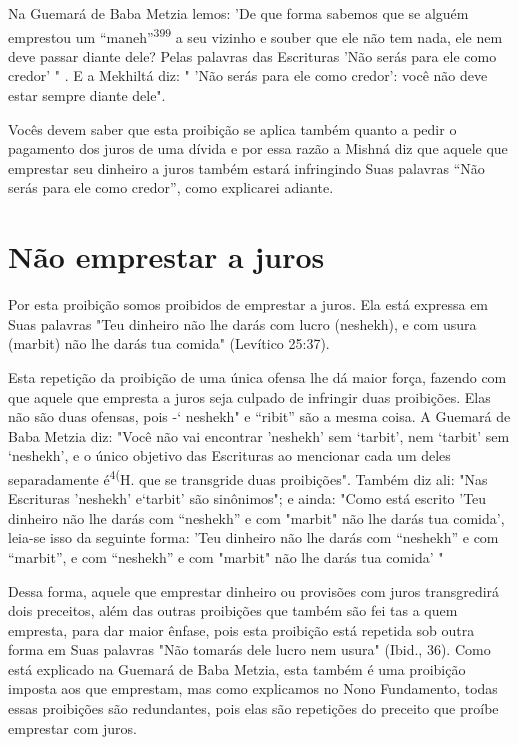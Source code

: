 Na Guemará de Baba Metzia lemos: 'De que forma sabemos que se alguém
emprestou um ``maneh''\textsuperscript{399} a seu vizinho e souber que ele
não tem na­da, ele nem deve passar diante dele? Pelas palavras das
Escrituras 'Não serás para ele como credor' " . E a Mekhiltá diz: " 'Não
serás para ele como credor': você não deve estar sempre diante dele".

Vocês devem saber que esta proibição se aplica também quanto a pedir o
pagamento dos juros de uma dívida e por essa razão a Mishná diz que
aquele que emprestar seu dinheiro a juros também estará infringindo Suas
pala­vras ``Não serás para ele como credor'', como explicarei adiante.

\section{Não emprestar a juros}

Por esta proibição somos proibidos de emprestar a juros. Ela está
expressa em Suas palavras "Teu dinheiro não lhe darás com lucro
(neshekh), e com usura (marbit) não lhe darás tua comida" (Levítico
25:37).

Esta repetição da proibição de uma única ofensa lhe dá maior força,
fazendo com que aquele que empresta a juros seja culpado de infringir
duas proibições. Elas não são duas ofensas, pois -` neshekh" e ``ribit''
são a mesma coisa. A Guemará de Baba Metzia diz: "Você não vai encontrar
'neshekh' sem `tarbit', nem `tarbit' sem `neshekh', e o único objetivo
das Escrituras ao men­cionar cada um deles separadamente
é\textsuperscript{4(}H. que se transgride duas
proibições". Também diz ali: "Nas Escrituras 'neshekh' e`tarbit' são
sinônimos"; e ainda: "Como está escrito 'Teu dinheiro não lhe darás com
``neshekh'' e com "mar­bit" não lhe darás tua comida', leia-se isso da
seguinte forma: 'Teu dinheiro não lhe darás com ``neshekh'' e com
``marbit'', e com ``neshekh'' e com "mar­bit" não lhe darás tua comida' "

Dessa forma, aquele que emprestar dinheiro ou provisões com ju­ros
transgredirá dois preceitos, além das outras proibições que também são
fei tas a quem empresta, para dar maior ênfase, pois esta proibição está
repetida sob outra forma em Suas palavras "Não tomarás dele lucro nem
usura" (Ibid., 36). Como está explicado na Guemará de Baba Metzia, esta
também é uma proi­bição imposta aos que emprestam, mas como explicamos
no Nono Fundamen­to, todas essas proibições são redundantes, pois elas
são repetições do preceito que proíbe emprestar com juros.


